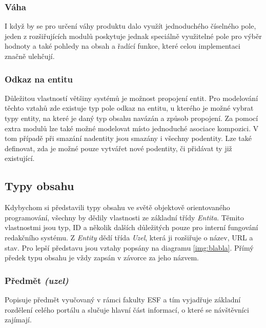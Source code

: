 \subsubsection*{Váha}
I když by se pro určení váhy produktu dalo využít jednoduchého číselného pole, jeden z rozšiřujících modulů poskytuje jednak speciálně využitelné pole pro výběr hodnoty a také pohledy na obsah a řadící funkce, které celou implementaci značně ulehčují.

\subsubsection*{Odkaz na entitu}
Důležitou vlastností většiny systémů je možnost propojení entit. Pro modelování těchto vztahů zde existuje typ pole odkaz na entitu, u kterého je možné vybrat typy entity, na které je daný typ obsahu navázán a způsob propojení. Za pomocí extra modulů lze také možné modelovat místo jednoduché asociace kompozici. V tom případě při smazání nadentity jsou smazány i všechny podentity. Lze také definovat, zda je možné pouze vytvářet nové podentity, či přidávat ty již existující.

\subsection{Typy obsahu}
Kdybychom si představili typy obsahu ve světě objektově orientovaného programování, všechny by dědily vlastnosti ze základní třídy \emph{Entita}. Těmito vlastnostmi jsou typ, ID a několik dalších důležitých pouze pro interní fungování redakčního systému. Z \emph{Entity} dědí třída \emph{Uzel}, která ji rozšiřuje o název, URL a stav. Pro lepší představu jsou vztahy popsány na diagramu \ref{img:blabla}. Přímý předek typu obsahu je vždy zapsán v závorce za jeho názvem.



\begin{center}
\end{center}

\subsubsection*{Předmět \emph{(uzel)}}
Popisuje předmět vyučovaný v rámci fakulty ESF a tím vyjadřuje základní rozdělení celého portálu a slučuje hlavní část informací, o které se návštěvníci zajímají. \\

